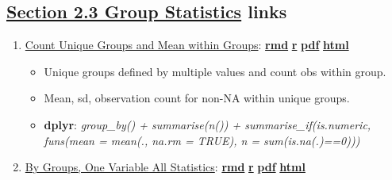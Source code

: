 \documentclass[
]{book}
\providecommand{\tightlist}{%
  \setlength{\itemsep}{0pt}\setlength{\parskip}{0pt}}
\begin{document}
\hypertarget{section-2.3-group-statisticsgroup-statistics-links}{%
\subsection{\texorpdfstring{\protect\hyperlink{group-statistics}{Section 2.3 Group Statistics} links}{Section 2.3 Group Statistics links}}\label{section-2.3-group-statisticsgroup-statistics-links}}

\begin{enumerate}
\def\labelenumi{\arabic{enumi}.}
\tightlist
\item
  \href{https://fanwangecon.github.io/R4Econ/summarize/aggregate/htmlpdfr/fs_group_unique_agg.html}{Count Unique Groups and Mean within Groups}: \href{https://github.com/FanWangEcon/R4Econ/blob/master/summarize/aggregate//fs_group_unique_agg.Rmd}{\textbf{rmd}} \textbar{} \href{https://github.com/FanWangEcon/R4Econ/blob/master/summarize/aggregate/htmlpdfr/fs_group_unique_agg.R}{\textbf{r}} \textbar{} \href{https://github.com/FanWangEcon/R4Econ/blob/master/summarize/aggregate/htmlpdfr/fs_group_unique_agg.pdf}{\textbf{pdf}} \textbar{} \href{https://fanwangecon.github.io/R4Econ/summarize/aggregate/htmlpdfr/fs_group_unique_agg.html}{\textbf{html}}

  \begin{itemize}
  \tightlist
  \item
    Unique groups defined by multiple values and count obs within group.
  \item
    Mean, sd, observation count for non-NA within unique groups.
  \item
    \textbf{dplyr}: \emph{group\_by() + summarise(n()) + summarise\_if(is.numeric, funs(mean = mean(., na.rm = TRUE), n = sum(is.na(.)==0)))}
  \end{itemize}
\item
  \href{https://fanwangecon.github.io/R4Econ/summarize/aggregate/htmlpdfr/fs_group_summ_one.html}{By Groups, One Variable All Statistics}: \href{https://github.com/FanWangEcon/R4Econ/blob/master/summarize/aggregate//fs_group_summ_one.Rmd}{\textbf{rmd}} \textbar{} \href{https://github.com/FanWangEcon/R4Econ/blob/master/summarize/aggregate/htmlpdfr/fs_group_summ_one.R}{\textbf{r}} \textbar{} \href{https://github.com/FanWangEcon/R4Econ/blob/master/summarize/aggregate/htmlpdfr/fs_group_summ_one.pdf}{\textbf{pdf}} \textbar{} \href{https://fanwangecon.github.io/R4Econ/summarize/aggregate/htmlpdfr/fs_group_summ_one.html}{\textbf{html}}


\end{enumerate}
\end{document}

